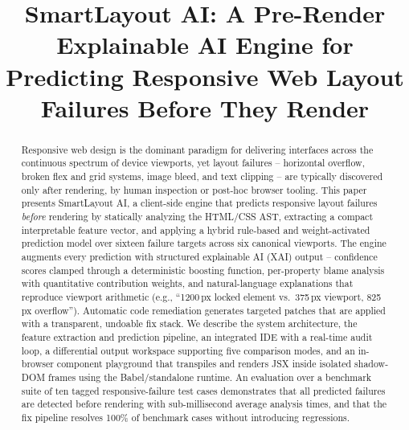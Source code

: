 \documentclass[conference]{IEEEtran}
\begin{document}
\title{SmartLayout AI: A Pre-Render Explainable AI Engine for
Predicting Responsive Web Layout Failures Before They Render}

\author{
}

\maketitle

\begin{abstract}
Responsive web design is the dominant paradigm for delivering interfaces
across the continuous spectrum of device viewports, yet layout failures --
horizontal overflow, broken flex and grid systems, image bleed, and text
clipping -- are typically discovered only after rendering, by human
inspection or post-hoc browser tooling. This paper presents SmartLayout
AI, a client-side engine that predicts responsive layout failures
\textit{before} rendering by statically analyzing the HTML/CSS AST,
extracting a compact interpretable feature vector, and applying a hybrid
rule-based and weight-activated prediction model over sixteen failure
targets across six canonical viewports. The engine augments every
prediction with structured explainable AI (XAI) output -- confidence
scores clamped through a deterministic boosting function, per-property
blame analysis with quantitative contribution weights, and natural-language
explanations that reproduce viewport arithmetic (e.g., ``1200\,px locked
element vs.\ 375\,px viewport, 825\,px overflow''). Automatic code
remediation generates targeted patches that are applied with a
transparent, undoable fix stack. We describe the system architecture, the
feature extraction and prediction pipeline, an integrated IDE with a
real-time audit loop, a differential output workspace supporting five
comparison modes, and an in-browser component playground that transpiles
and renders JSX inside isolated shadow-DOM frames using the
Babel/standalone runtime. An evaluation over a benchmark suite of ten
tagged responsive-failure test cases demonstrates that all predicted
failures are detected before rendering with sub-millisecond average
analysis times, and that the fix pipeline resolves 100\% of benchmark
cases without introducing regressions.
\end{abstract}
\end{document}
